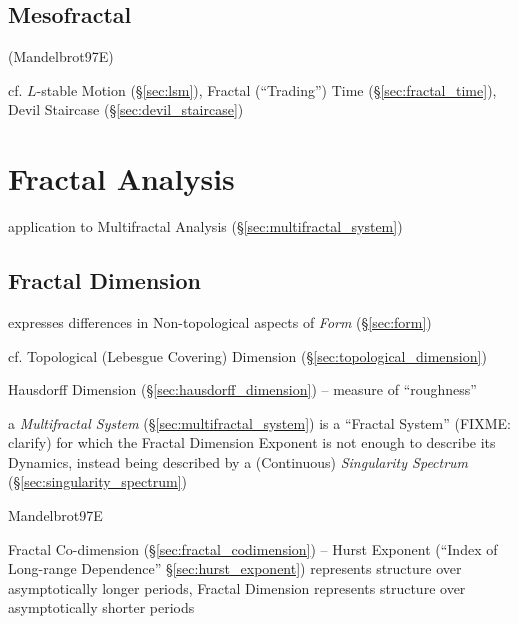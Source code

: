 \subsection{Mesofractal}\label{sec:mesofractal}

(Mandelbrot97E)

cf. $L$-stable Motion (\S\ref{sec:lsm}), Fractal (``Trading'') Time
(\S\ref{sec:fractal_time}), Devil Staircase (\S\ref{sec:devil_staircase})



\section{Fractal Analysis}\label{sec:fractal_analysis}

application to Multifractal Analysis (\S\ref{sec:multifractal_system})



\subsection{Fractal Dimension}\label{sec:fractal_dimension}

expresses differences in Non-topological aspects of \emph{Form}
(\S\ref{sec:form})

cf. Topological (Lebesgue Covering) Dimension
(\S\ref{sec:topological_dimension})

Hausdorff Dimension (\S\ref{sec:hausdorff_dimension}) -- measure of
``roughness''

\fist a \emph{Multifractal System} (\S\ref{sec:multifractal_system}) is a
``Fractal System'' (FIXME: clarify) for which the Fractal Dimension Exponent is
not enough to describe its Dynamics, instead being described by a (Continuous)
\emph{Singularity Spectrum} (\S\ref{sec:singularity_spectrum})

Mandelbrot97E

Fractal Co-dimension (\S\ref{sec:fractal_codimension}) --
Hurst Exponent (``Index of Long-range Dependence'' \S\ref{sec:hurst_exponent})
represents structure over asymptotically longer periods, Fractal Dimension
represents structure over asymptotically shorter periods

